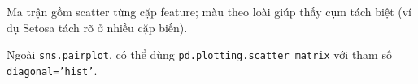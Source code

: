 \begin{ynghia}[title={Đọc biểu đồ}]
Ma trận gồm scatter từng cặp feature; màu theo loài giúp thấy cụm tách biệt (ví dụ Setosa tách rõ ở nhiều cặp biến).
\end{ynghia}

\begin{vidu}[title={Output}]
\end{vidu}

\begin{luuy}[title={Pandas scatter\_matrix}]
Ngoài \texttt{sns.pairplot}, có thể dùng \texttt{pd.plotting.scatter\_matrix} với tham số \texttt{diagonal='hist'}.
\end{luuy}
